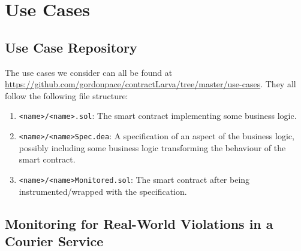 \documentclass{article}
\begin{document}
   
   
   
    

   
  \section{Use Cases}
  
      \subsection{Use Case Repository}
      
      The use cases we consider can all be found at \url{https://github.com/gordonpace/contractLarva/tree/master/use-cases}. They all follow the following file structure: 
      \begin{enumerate}
       \item \texttt{<name>/<name>.sol}: The smart contract implementing some business logic.
       \item \texttt{<name>/<name>Spec.dea}: A specification of an aspect of the business logic, possibly including some business logic transforming the behaviour of the smart contract.
       \item \texttt{<name>/<name>Monitored.sol}: The smart contract after being instrumented/wrapped with the specification.
      \end{enumerate}
       
  
  

   \subsection{Monitoring for Real-World Violations in a Courier Service} 
   
\end{document}
